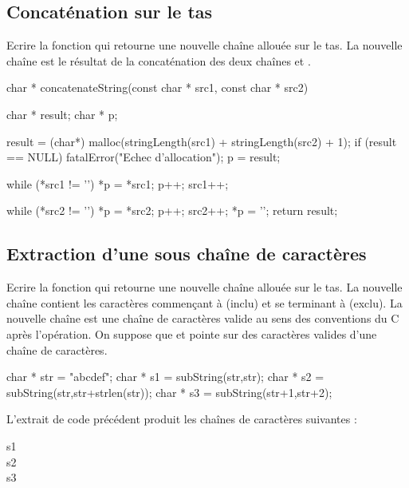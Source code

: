 \subsection{Concaténation sur le tas}

Ecrire la fonction  qui retourne une nouvelle chaîne allouée sur le tas. La nouvelle chaîne est le résultat de la concaténation des deux chaînes  et .

\begin{csourcecorrection}
char * concatenateString(const char * src1, const char * src2) {
    char * result;
    char * p;

    result = (char*) malloc(stringLength(src1) + stringLength(src2) + 1);
    if (result == NULL)
        fatalError("Echec d'allocation");
    p = result;

    while (*src1 != '\0') {
        *p = *src1;
        p++;
        src1++;
    }

    while (*src2 != '\0') {
        *p = *src2;
        p++;
        src2++;
    }
    *p = '\0';
    return result;
}
\end{csourcecorrection}

\subsection{Extraction d'une sous chaîne de caractères}

Ecrire la fonction  qui retourne une nouvelle chaîne allouée sur le tas. La nouvelle chaîne contient les caractères commençant à  (inclu) et se terminant à  (exclu). La nouvelle chaîne est une chaîne de  caractères valide au sens des conventions du C après l'opération. On suppose que  et  pointe sur des caractères valides d'une chaîne de caractères.

\begin{csource}
char * str = "abcdef";
char * s1 = subString(str,str);
char * s2 = subString(str,str+strlen(str));
char * s3 = subString(str+1,str+2);
\end{csource}
L'extrait de code précédent produit les chaînes de caractères suivantes :
\begin{description}
  \item[s1] 
  \item[s2] 
  \item[s3] 
\end{description}

